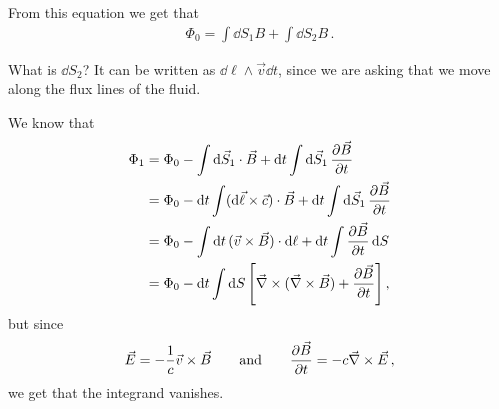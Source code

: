 \documentclass[main.tex]{subfiles}
\begin{document}
From this equation we get that 
%
\begin{align}
\Phi_0 = \int \dd{S_1} B + \int \dd{S_2} B
\,.
\end{align}

What is \(\dd{S_2}\)? It can be written as \(\dd{\ell} \wedge \vec{v} \dd{t}\), since we are asking that we move along the flux lines of the fluid. 

We know that 
%
\begin{align}
\Phi_1 
&= \Phi_0 - \int \dd{\vec{S}_1} \cdot \vec{B} 
 + \dd{t} \int \dd{\vec{S}_1} \pdv{\vec{B}}{t} (\vec{x} + \vec{v} \dd{t} , t_0 )  \\
&= \Phi_0 - \dd{t} \int (\dd{\vec{\ell}} \times \vec{c}) \cdot \vec{B} 
 + \dd{t} \int \dd{\vec{S}_1} \pdv{\vec{B}}{t} (\vec{x} + \vec{v} \dd{t} , t_0 )  \\
&= \Phi_0 - \int \dd{t} (\vec{v} \times \vec{B}) \cdot \dd{\ell} + \dd{t} \int \pdv{\vec{B}}{t} \dd{S}  \\
&= \Phi_0 - \dd{t} \int \dd{S} \qty[ \vec{\nabla} \times (\vec{\nabla} \times \vec{B}) + \pdv{\vec{B}}{t}]
\,,
\end{align}
%
but since
%
\begin{align}
\vec{E} = - \frac{1}{c} \vec{v} \times \vec{B}
\qquad \text{and} \qquad
\pdv{\vec{B}}{t} = - c \vec{\nabla} \times \vec{E}
\,,
\end{align}
%
we get that the integrand vanishes. 

\end{document}
